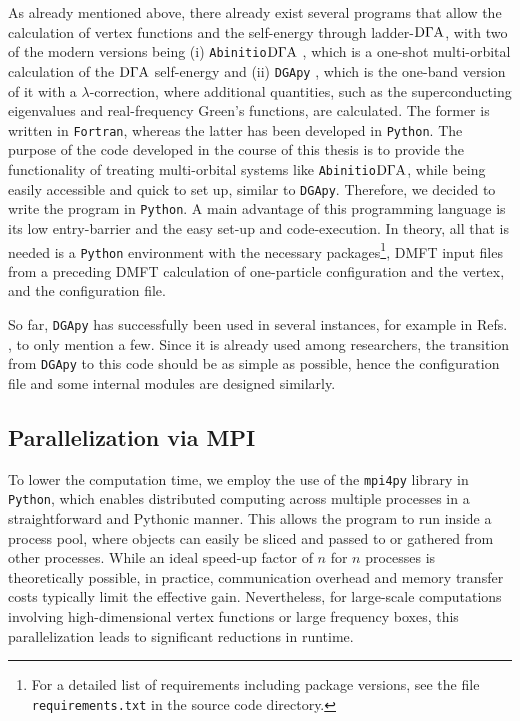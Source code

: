 \documentclass[../../main.tex]{subfiles}
\begin{document}
As already mentioned above, there already exist several programs that allow the calculation of vertex functions and the self-energy through ladder-$\text{D}\Gamma\text{A}$, with two of the modern versions being (i) \texttt{Abinitio$\text{D}\Gamma\text{A}$} \cite{Galler2019, Galler2018, Galler2017}, which is a one-shot multi-orbital calculation of the $\text{D}\Gamma\text{A}$ self-energy and (ii) \texttt{DGApy} \cite{Worm2023}, which is the one-band version of it with a $\lambda$-correction, where additional quantities, such as the superconducting eigenvalues and real-frequency Green's functions, are calculated. The former is written in \texttt{Fortran}, whereas the latter has been developed in \texttt{Python}.
The purpose of the code developed in the course of this thesis is to provide the functionality of treating multi-orbital systems like \texttt{Abinitio$\text{D}\Gamma\text{A}$}, while being easily accessible and quick to set up, similar to \texttt{DGApy}. Therefore, we decided to write the program in \texttt{Python}. A main advantage of this programming language is its low entry-barrier and the easy set-up and code-execution. In theory, all that is needed is a \texttt{Python} environment with the necessary packages\footnote{For a detailed list of requirements including package versions, see the file \texttt{requirements.txt} in the source code directory.}, DMFT input files from a preceding DMFT calculation of one-particle configuration and the vertex, and the configuration file.

So far, \texttt{DGApy} has successfully been used in several instances, for example in Refs. \cite{DiCataldo2024, Worm2024}, to only mention a few. Since it is already used among researchers, the transition from \texttt{DGApy} to this code should be as simple as possible, hence the configuration file and some internal modules are designed similarly.

\subsection{Parallelization via MPI}

To lower the computation time, we employ the use of the \texttt{mpi4py} library in \texttt{Python}, which enables distributed computing across multiple processes in a straightforward and Pythonic manner. This allows the program to run inside a process pool, where objects can easily be sliced and passed to or gathered from other processes. While an ideal speed-up factor of $n$ for $n$ processes is theoretically possible, in practice, communication overhead and memory transfer costs typically limit the effective gain. Nevertheless, for large-scale computations involving high-dimensional vertex functions or large frequency boxes, this parallelization leads to significant reductions in runtime.
\end{document}
